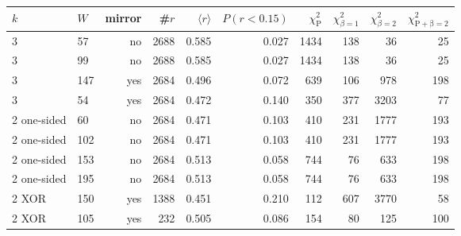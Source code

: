 \begin{tabular}{llrrrrrrrr}
\toprule
$k$ & $W$ & mirror & \#$r$ & $\langle r\rangle$ & $P(r<0.15)$ & $\chi^2_\mathrm{P}$ & $\chi^2_{\beta=1}$ & $\chi^2_{\beta=2}$ & $\chi^2_\mathrm{P+\beta=2}$ \\
\midrule
3 & 57 & no & 2688 & 0.585 & 0.027 & 1434 & 138 & 36 & 25 \\
3 & 99 & no & 2688 & 0.585 & 0.027 & 1434 & 138 & 36 & 25 \\
3 & 147 & yes & 2684 & 0.496 & 0.072 & 639 & 106 & 978 & 198 \\
3 & 54 & yes & 2684 & 0.472 & 0.140 & 350 & 377 & 3203 & 77 \\
2 one-sided & 60 & no & 2684 & 0.471 & 0.103 & 410 & 231 & 1777 & 193 \\
2 one-sided & 102 & no & 2684 & 0.471 & 0.103 & 410 & 231 & 1777 & 193 \\
2 one-sided & 153 & no & 2684 & 0.513 & 0.058 & 744 & 76 & 633 & 198 \\
2 one-sided & 195 & no & 2684 & 0.513 & 0.058 & 744 & 76 & 633 & 198 \\
2 XOR & 150 & yes & 1388 & 0.451 & 0.210 & 112 & 607 & 3770 & 58 \\
2 XOR & 105 & yes & 232 & 0.505 & 0.086 & 154 & 80 & 125 & 100 \\
\bottomrule
\end{tabular}
